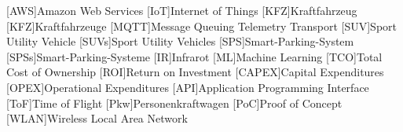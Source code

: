 \begin{acronym}[KFZ]
    [AWS]{Amazon Web Services}
    [IoT]{Internet of Things}
    [KFZ]{Kraftfahrzeug}
    [KFZ]{Kraftfahrzeuge}
    [MQTT]{Message Queuing Telemetry Transport}
    [SUV]{Sport Utility Vehicle}
    [SUVs]{Sport Utility Vehicles}
    [SPS]{Smart-Parking-System}
    [SPSs]{Smart-Parking-Systeme}
    [IR]{Infrarot}
    [ML]{Machine Learning}
    [TCO]{Total Cost of Ownership}
    [ROI]{Return on Investment}
    [CAPEX]{Capital Expenditures}
    [OPEX]{Operational Expenditures}
    [API]{Application Programming Interface}
    [ToF]{Time of Flight}
    [Pkw]{Personenkraftwagen}
    [PoC]{Proof of Concept}
    [WLAN]{Wireless Local Area Network}
\end{acronym}